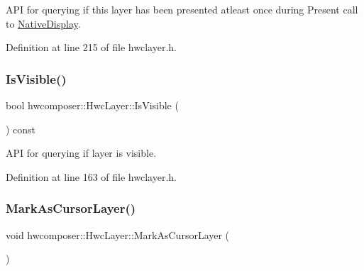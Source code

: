 A\+PI for querying if this layer has been presented atleast once during Present call to \mbox{\hyperlink{classhwcomposer_1_1NativeDisplay}{Native\+Display}}. 

Definition at line 215 of file hwclayer.\+h.


\begin{DoxyCode}{0}
\end{DoxyCode}
\mbox{\label{structhwcomposer_1_1HwcLayer_a9c5860d1891bc9bbd1349e03455880e1}} 
\subsubsection{\texorpdfstring{Is\+Visible()}{IsVisible()}}
{\footnotesize\ttfamily bool hwcomposer\+::\+Hwc\+Layer\+::\+Is\+Visible (\begin{DoxyParamCaption}{ }\end{DoxyParamCaption}) const\hspace{0.3cm}{\ttfamily [inline]}}

A\+PI for querying if layer is visible. 

Definition at line 163 of file hwclayer.\+h.


\begin{DoxyCode}{0}
\end{DoxyCode}
\mbox{\label{structhwcomposer_1_1HwcLayer_a7556bacbb2697f51b2c2cc30a9ed661a}} 
\subsubsection{\texorpdfstring{Mark\+As\+Cursor\+Layer()}{MarkAsCursorLayer()}}
{\footnotesize\ttfamily void hwcomposer\+::\+Hwc\+Layer\+::\+Mark\+As\+Cursor\+Layer (\begin{DoxyParamCaption}{ }\end{DoxyParamCaption})}




